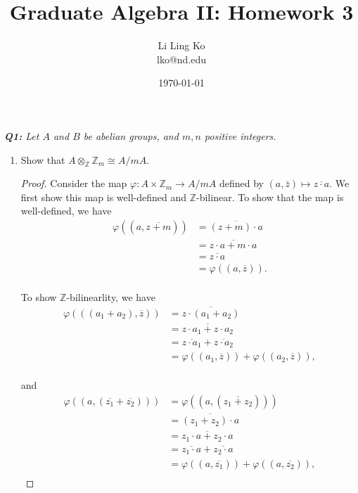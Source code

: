 \documentclass{article}
\begin{document}
\title{Graduate Algebra II: Homework 3}
\author{Li Ling Ko\\ lko@nd.edu}
\date{\today}
\maketitle

\it \textbf{Q1:} Let $A$ and $B$ be abelian groups, and $m,n$ positive
  integers.
  \begin{enumerate}[label={(\alph*)}]
    \item Show that $A\otimes_\mathbb{Z}\mathbb{Z}_m \cong A/mA$.
      \begin{proof}
        Consider the map $\varphi:A\times\mathbb{Z}_m
        \rightarrow A/mA$ defined by
        $(a,\bar{z})\mapsto\overline{z\cdot a}$. We first show this map
        is well-defined and $\mathbb{Z}$-bilinear. To show that the map is
        well-defined, we have
        \begin{align*}
          \varphi((a,\overline{z+m})) &=\overline{(z+m)\cdot a}\\
          &=\overline{z\cdot a+m\cdot a}\\
          &=\overline{z\cdot a}\\
          &=\varphi((a,\overline{z})).\\
        \end{align*}

        To show $\mathbb{Z}$-bilinearlity, we have
        \begin{align*}
          \varphi(((a_1+a_2),\overline{z})) &=\overline{z\cdot
            (a_1+a_2)}\\
          &=\overline{z\cdot a_1 +z\cdot a_2}\\
          &=\overline{z\cdot a_1} +\overline{z\cdot a_2}\\
          &=\varphi((a_1,\overline{z}))
            +\varphi((a_2,\overline{z})),\\
        \end{align*}

        and
        \begin{align*}
          \varphi((a,(\overline{z_1}+\overline{z_2})))
            &=\varphi((a,(\overline{z_1+z_2})))\\
          &=\overline{(z_1+z_2)\cdot a}\\
          &=\overline{z_1\cdot a +z_2\cdot a}\\
          &=\overline{z_1\cdot a} +\overline{z_2\cdot a}\\
          &=\varphi((a,\overline{z_1}))
            +\varphi((a,\overline{z_2})),\\
        \end{align*}


\end{proof}
\end{enumerate}
\end{document}
